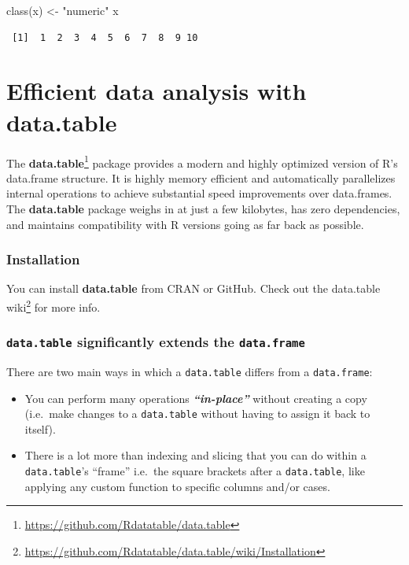 \documentclass[
]{book}
\newenvironment{Shaded}{\begin{snugshade}}{\end{snugshade}}
\newcommand{\FunctionTok}[1]{\textcolor[rgb]{0.00,0.00,0.00}{#1}}
\newcommand{\NormalTok}[1]{#1}
\newcommand{\OtherTok}[1]{\textcolor[rgb]{0.56,0.35,0.01}{#1}}
\newcommand{\StringTok}[1]{\textcolor[rgb]{0.31,0.60,0.02}{#1}}
\DeclareRobustCommand{\href}[2]{#2\footnote{\url{#1}}}
\providecommand{\tightlist}{%
  \setlength{\itemsep}{0pt}\setlength{\parskip}{0pt}}
\begin{document}
\begin{Shaded}
\begin{Highlighting}[]
\FunctionTok{class}\NormalTok{(x) }\OtherTok{\textless{}{-}} \StringTok{"numeric"}
\NormalTok{x}
\end{Highlighting}
\end{Shaded}

\begin{verbatim}
 [1]  1  2  3  4  5  6  7  8  9 10
\end{verbatim}

\hypertarget{datatable}{%
\chapter{\texorpdfstring{Efficient data analysis with \textbf{data.table}}{Efficient data analysis with data.table}}\label{datatable}}

The \href{https://github.com/Rdatatable/data.table}{\textbf{data.table}} package provides a modern and highly optimized version of R's data.frame structure. It is highly memory efficient and automatically parallelizes internal operations to achieve substantial speed improvements over data.frames. The \textbf{data.table} package weighs in at just a few kilobytes, has zero dependencies, and maintains compatibility with R versions going as far back as possible.

\hypertarget{installation}{%
\subsection{Installation}\label{installation}}

You can install \textbf{data.table} from CRAN or GitHub. Check out the \href{https://github.com/Rdatatable/data.table/wiki/Installation}{data.table wiki} for more info.

\hypertarget{data.table-significantly-extends-the-data.frame}{%
\subsection{\texorpdfstring{\texttt{data.table} significantly extends the \texttt{data.frame}}{data.table significantly extends the data.frame}}\label{data.table-significantly-extends-the-data.frame}}

There are two main ways in which a \texttt{data.table} differs from a \texttt{data.frame}:

\begin{itemize}
\tightlist
\item
  You can perform many operations \textbf{\emph{``in-place''}} without creating a copy (i.e.~make changes to a \texttt{data.table} without having to assign it back to itself).
\item
  There is a lot more than indexing and slicing that you can do within a \texttt{data.table}'s ``frame'' i.e.~the square brackets after a \texttt{data.table}, like applying any custom function to specific columns and/or cases.
\end{itemize}
\end{document}
